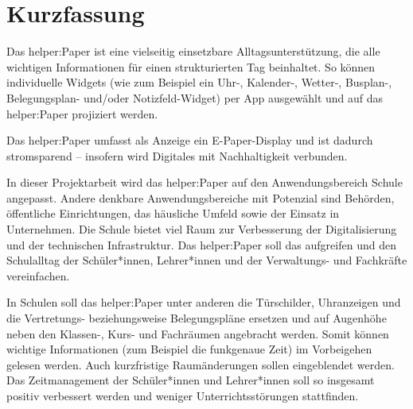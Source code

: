 \documentclass[10pt]{article}
\begin{document}
\begin{titlepage}



\end{titlepage}
\thispagestyle{empty}
\setcounter{secnumdepth}{3}
\setcounter{tocdepth}{3}
\renewcommand*\contentsname{Inhaltsverzeichnis}
\tableofcontents
\clearpage
{}
\setcounter{page}{1}
\setcounter{secnumdepth}{-1}
\section{Kurzfassung}
Das helper:Paper ist eine vielseitig einsetzbare Alltagsunterstützung, die alle wichtigen Informationen für einen strukturierten Tag beinhaltet. So können individuelle Widgets (wie zum Beispiel ein Uhr-, Kalender-, Wetter-, Busplan-, Belegungsplan- und/oder Notizfeld-Widget) per App ausgewählt und auf das helper:Paper projiziert werden.

Das helper:Paper umfasst als Anzeige ein E-Paper-Display und ist dadurch stromsparend – insofern wird Digitales mit Nachhaltigkeit verbunden.

In dieser Projektarbeit wird das helper:Paper auf den Anwendungsbereich Schule angepasst. Andere denkbare Anwendungsbereiche mit Potenzial sind Behörden, öffentliche Einrichtungen, das häusliche Umfeld sowie der Einsatz in Unternehmen.
Die Schule bietet viel Raum zur Verbesserung der Digitalisierung und der technischen Infrastruktur. Das helper:Paper soll das aufgreifen und den Schulalltag der Schüler*innen, Lehrer*innen und der Verwaltungs- und Fachkräfte vereinfachen.

In Schulen soll das helper:Paper unter anderen die Türschilder, Uhranzeigen und die Vertretungs- beziehungsweise Belegungspläne ersetzen und auf Augenhöhe neben den Klassen-, Kurs- und Fachräumen angebracht werden. Somit können wichtige Informationen (zum Beispiel die funkgenaue Zeit) im Vorbeigehen gelesen werden. Auch kurzfristige Raumänderungen sollen eingeblendet werden. Das Zeitmanagement der Schüler*innen und Lehrer*innen soll so insgesamt positiv verbessert werden und weniger Unterrichtsstörungen stattfinden. 
\setcounter{secnumdepth}{3}
\end{document}
